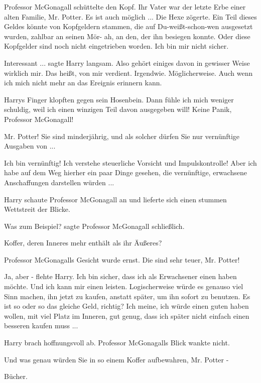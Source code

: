 Professor McGonagall schüttelte den Kopf. \glqq{}Ihr Vater war der letzte Erbe
einer alten Familie, Mr. Potter. Es ist auch möglich ...\grqq{} Die Hexe
zögerte. \glqq{}Ein Teil dieses Geldes könnte von Kopfgeldern stammen, die auf
Du-weißt-schon-wen ausgesetzt wurden, zahlbar an seinen Mör- ah, an den, der ihn
besiegen konnte. Oder diese Kopfgelder sind noch nicht eingetrieben worden. Ich
bin mir nicht sicher.\grqq{}

\glqq{}Interessant ...\grqq{} sagte Harry langsam. \glqq{}Also gehört einiges davon
in gewisser Weise wirklich mir. Das heißt, von mir verdient. Irgendwie.
Möglicherweise. Auch wenn ich mich nicht mehr an das Ereignis erinnern
kann.\grqq{}

Harrys Finger klopften gegen sein Hosenbein. \glqq{}Dann fühle ich mich weniger
schuldig, weil ich einen winzigen Teil davon ausgegeben will! Keine Panik,
Professor McGonagall!\grqq{}

\glqq{}Mr. Potter! Sie sind minderjährig, und als solcher dürfen Sie nur
vernünftige Ausgaben von ...\grqq{}

\glqq{}Ich bin vernünftig! Ich verstehe steuerliche Vorsicht und Impulskontrolle!
Aber ich habe auf dem Weg hierher ein paar Dinge gesehen, die vernünftige,
erwachsene Anschaffungen darstellen würden ...\grqq{}

Harry schaute Professor McGonagall an und lieferte sich einen stummen Wettstreit
der Blicke.

\glqq{}Was zum Beispiel?\grqq{} sagte Professor McGonagall schließlich.

\glqq{}Koffer, deren Inneres mehr enthält als ihr Äußeres?\grqq{}

Professor McGonagalls Gesicht wurde ernst. \glqq{}Die sind sehr teuer, Mr.
Potter!\grqq{}

\glqq{}Ja, aber -\grqq{} flehte Harry. \glqq{}Ich bin sicher, dass ich als
Erwachsener einen haben möchte. Und ich kann mir einen leisten. Logischerweise
würde es genauso viel Sinn machen, ihn jetzt zu kaufen, anstatt später, um ihn
sofort zu benutzen. Es ist so oder so das gleiche Geld, richtig? Ich meine, ich
würde einen guten haben wollen, mit viel Platz im Inneren, gut genug, dass ich
später nicht einfach einen besseren kaufen muss ...\grqq{}

Harry brach hoffnungsvoll ab. Professor McGonagalls Blick wankte nicht.

\glqq{}Und was genau würden Sie in so einem Koffer aufbewahren, Mr. Potter
-\grqq{}

\glqq{}Bücher.\grqq{}

